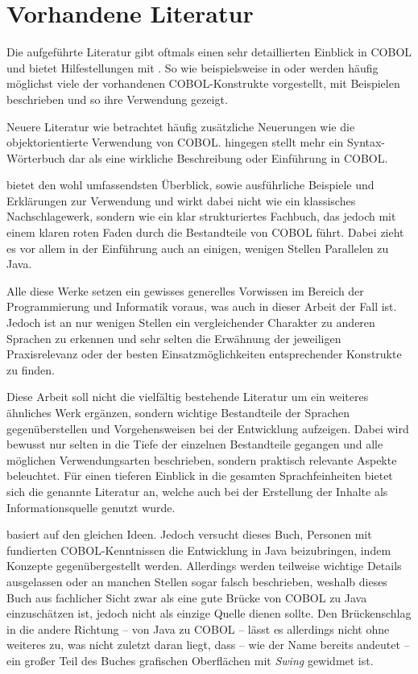 \section{Vorhandene Literatur}
Die aufgeführte Literatur gibt oftmals einen sehr detaillierten Einblick in COBOL und bietet Hilfestellungen mit . So wie beispielsweise in  oder  werden häufig möglichst viele der vorhandenen COBOL-Konstrukte vorgestellt, mit Beispielen beschrieben und so ihre Verwendung gezeigt. 

Neuere Literatur wie  betrachtet häufig zusätzliche Neuerungen wie die objektorientierte Verwendung von COBOL.  
hingegen stellt mehr ein Syntax-Wörterbuch dar als eine wirkliche Beschreibung oder Einführung in COBOL.

 bietet den wohl umfassendsten Überblick, sowie ausführliche Beispiele und Erklärungen zur Verwendung und wirkt dabei nicht wie ein klassisches Nachschlagewerk, sondern wie ein klar strukturiertes Fachbuch, das jedoch mit einem klaren roten Faden durch die Bestandteile von COBOL führt. Dabei zieht es vor allem in der Einführung auch an einigen, wenigen Stellen Parallelen zu Java. 

Alle diese Werke setzen ein gewisses generelles Vorwissen im Bereich der Programmierung und Informatik voraus, was auch in dieser Arbeit der Fall ist. Jedoch ist an nur wenigen Stellen ein vergleichender Charakter zu anderen Sprachen zu erkennen und sehr selten die Erwähnung der jeweiligen Praxisrelevanz oder der besten Einsatzmöglichkeiten entsprechender Konstrukte zu finden. 

Diese Arbeit soll nicht die vielfältig bestehende Literatur um ein weiteres ähnliches Werk ergänzen, sondern wichtige Bestandteile der Sprachen gegenüberstellen und Vorgehensweisen bei der Entwicklung aufzeigen. Dabei wird bewusst nur selten in die Tiefe der einzelnen Bestandteile gegangen und alle möglichen Verwendungsarten beschrieben, sondern praktisch relevante Aspekte beleuchtet. Für einen tieferen Einblick in die gesamten Sprachfeinheiten bietet sich die genannte Literatur an, welche auch bei der Erstellung der Inhalte als Informationsquelle genutzt wurde.

 basiert auf den gleichen Ideen. Jedoch versucht dieses Buch, Personen mit fundierten COBOL-Kenntnissen die Entwicklung in Java beizubringen, indem Konzepte gegenübergestellt werden. Allerdings werden teilweise wichtige Details ausgelassen oder an manchen Stellen sogar falsch beschrieben, weshalb dieses Buch aus fachlicher Sicht zwar als eine gute Brücke von COBOL zu Java einzuschätzen ist, jedoch nicht als einzige Quelle dienen sollte. Den Brückenschlag in die andere Richtung -- von Java zu COBOL -- lässt es allerdings nicht ohne weiteres zu, was nicht zuletzt daran liegt, dass -- wie der Name bereits andeutet -- ein großer Teil des Buches grafischen Oberflächen mit \textit{Swing} gewidmet ist.


